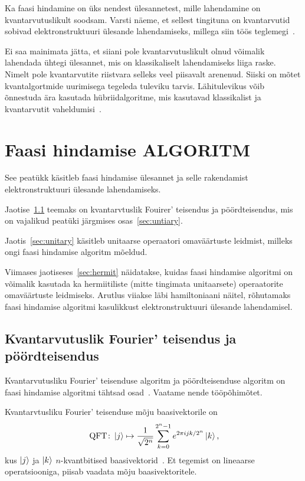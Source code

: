 \documentclass[12pt]{report}
\def\ket#1{\mathinner{|#1\rangle}}
\def\QFT{\mathop{\mathrm{QFT}}\nolimits}
\begin{document}
Ka faasi hindamine on üks nendest ülesannetest, mille lahendamine on kvantarvutuslikult soodsam.
Varsti näeme, et sellest tingituna on kvantarvutid sobivad elektronstruktuuri ülesande lahendamiseks, millega siin töös teglemegi~\cite{cao+etal, mcardle+etal}.

Ei saa mainimata jätta, et siiani pole kvantarvutuslikult olnud võimalik lahendada ühtegi ülesannet, mis on klassikaliselt lahendamiseks liiga raske.
Nimelt pole kvantarvutite riistvara selleks veel piisavalt arenenud.
Siiski on mõtet kvantalgortmide uurimisega tegeleda tuleviku tarvis.
Lähitulevikus võib õnnestuda ära kasutada hübriidalgoritme, mis kasutavad klassikalist ja kvantarvutit vaheldumisi~\cite{omalley+etal}.



\section{Faasi hindamise ALGORITM}\label{sec:pea}

See peatükk käsitleb faasi hindamise ülesannet ja selle rakendamist elektronstruktuuri ülesande lahendamiseks.

Jaotise~\ref{sec:qft} teemaks on kvantarvtuslik Fouirer' teisendus ja pöördteisendus, mis on vajalikud peatüki järgmises osas~\ref{sec:untiary}.

Jaotis~\ref{sec:unitary} käsitleb unitaarse operaatori omaväärtuste leidmist, milleks ongi faasi hindamise algoritm mõeldud.

Viimases jaotiseses~\ref{sec:hermit} näidatakse, kuidas faasi hindamise algoritmi on võimalik kasutada ka hermiitiliste (mitte tingimata unitaarsete) operaatorite omaväärtuste leidmiseks.
Arutlus viiakse läbi hamiltoniaani näitel, rõhutamaks faasi hindamise algoritmi kasulikkust elektronstruktuuri ülesande lahendamisel.


\subsection{Kvantarvutuslik Fourier' teisendus ja pöördteisendus}\label{sec:qft}

Kvantarvutusliku Fourier' teisenduse algoritm ja pöördteisenduse algoritm on faasi hindamise algoritmi tähtsad osad~\cite{nielsen+chuang, kaye+laflamme+mosca}.
Vaatame nende tööpõhimõtet.

Kvantarvtusliku Fourier' teisenduse mõju baasivektorile on
\begin{align}\label{f:qftdef}
    \QFT\colon
    \ket{j} \mapsto \frac{1}{\sqrt{2^n}} \sum_{k=0}^{2^n-1} e^{2\pi ijk/2^n} \ket{k} \rlap{,}
\end{align}
kus \(\ket{j}\) ja \(\ket{k}\) \(n\)-kvantbitised
baasivektorid~\cite{nielsen+chuang, kaye+laflamme+mosca}. Et tegemist on
lineaarse operatsiooniga, piisab vaadata mõju baasivektoritele.
\end{document}
